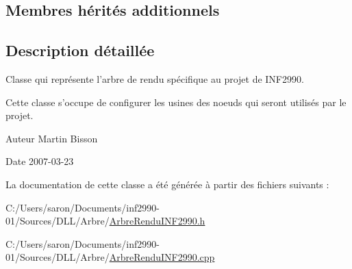 \subsection*{Membres hérités additionnels}


\subsection{Description détaillée}
Classe qui représente l'arbre de rendu spécifique au projet de I\-N\-F2990. 

Cette classe s'occupe de configurer les usines des noeuds qui seront utilisés par le projet.

\begin{DoxyAuthor}{Auteur}
Martin Bisson 
\end{DoxyAuthor}
\begin{DoxyDate}{Date}
2007-\/03-\/23 
\end{DoxyDate}


La documentation de cette classe a été générée à partir des fichiers suivants \-:\begin{DoxyCompactItemize}
\item 
C\-:/\-Users/saron/\-Documents/inf2990-\/01/\-Sources/\-D\-L\-L/\-Arbre/\hyperlink{_arbre_rendu_i_n_f2990_8h}{Arbre\-Rendu\-I\-N\-F2990.\-h}\item 
C\-:/\-Users/saron/\-Documents/inf2990-\/01/\-Sources/\-D\-L\-L/\-Arbre/\hyperlink{_arbre_rendu_i_n_f2990_8cpp}{Arbre\-Rendu\-I\-N\-F2990.\-cpp}\end{DoxyCompactItemize}
